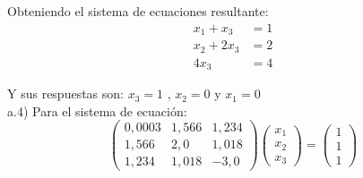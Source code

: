 Obteniendo el sistema de ecuaciones resultante:
\begin{align*}
    x_1+x_3 &=1 \\
    x_2+2x_3 &=2 \\
    4x_3 &=4
\end{align*}

Y sus respuestas son: $x_3=1$ , $x_2=0$ y $x_1=0$\\

a.4) Para el sistema de ecuación:\\
\begin{equation*}
    \begin{pmatrix}
        0,0003 & 1,566 & 1,234 \\
        1,566 & 2,0 & 1,018 \\
        1,234 & 1,018 & -3,0
    \end{pmatrix}
    \begin{pmatrix}
        x_1 \\
        x_2 \\
        x_3
    \end{pmatrix}    
    =    
    \begin{pmatrix}
        1 \\
        1 \\
        1
    \end{pmatrix}
\end{equation*}

